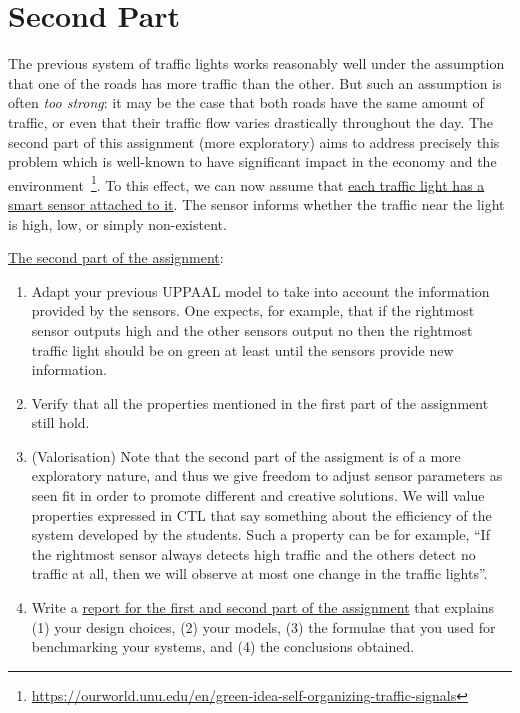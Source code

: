 \documentclass[11pt]{article}
\theoremstyle{myplain}
\theoremstyle{definition} %
\begin{document}
\section*{Second Part}

The previous system of traffic lights works reasonably well under the
assumption that one of the roads has more traffic than the other. But
such an assumption is often \emph{too strong}: it may be the case that
both roads have the same amount of traffic, or even that their traffic
flow varies drastically throughout the day. The second part of this
assignment (more exploratory) aims to address precisely this problem
which is well-known to have significant impact in the economy and the
environment~\footnote{\url{https://ourworld.unu.edu/en/green-idea-self-organizing-traffic-signals}}. To
this effect, we can now assume that \underline{each traffic light has
  a smart sensor attached to it}. The sensor informs whether the
traffic near the light is \textsf{high}, \textsf{low}, or simply
\textsf{no}n-existent.

\medskip
\noindent
\underline{The second part of the assignment}:
\begin{enumerate}
\item Adapt your previous UPPAAL model to take into account the
  information provided by the sensors. One expects, for example, that
  if the rightmost sensor outputs \textsf{high} and the other sensors
  output \textsf{no} then the rightmost traffic light should be on
  green at least until the sensors provide new information.
\item Verify that all the properties mentioned in the first part
  of the assignment still hold.
\item (Valorisation) Note that the second part of the assigment is of
  a more exploratory nature, and thus we give freedom to adjust sensor
  parameters as seen fit in order to promote different and creative
  solutions. We will value properties expressed in CTL that say
  something about the efficiency of the system developed by the
  students.  Such a property can be for example, ``If the rightmost
  sensor always detects \textsf{high} traffic and the others detect
  \textsf{no} traffic at all, then we will observe at most one change
  in the traffic lights''.
\item Write a \underline{report for the first and second part of the
    assignment} that explains (1) your design choices, (2) your models,
  (3) the formulae that you used for benchmarking your systems, and (4)
  the conclusions obtained.
\end{enumerate}
\end{document}
